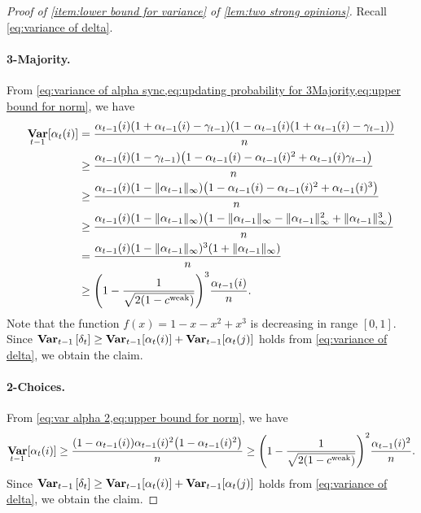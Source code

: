 \documentclass[letterpaper,11pt]{article}
\DeclarePairedDelimiter{\rbra}{\lparen}{\rparen} %
\DeclarePairedDelimiter{\sbra}{\lbrack}{\rbrack} %
\DeclareMathOperator*{\Var}{\mathbf{Var}}
\newcommand{\alphanorm}{\gamma}
\newcommand{\cweak}{c^{\mathrm{weak}}}
\newcommand{\opinion}{\mathsf{opn}}
\begin{document}
\begin{proof}[Proof of \cref{item:lower bound for variance} of \cref{lem:two strong opinions}]
    Recall \cref{eq:variance of delta}.
    \paragraph*{3-Majority.}
    From \cref{eq:variance of alpha sync,eq:updating probability for 3Majority,eq:upper bound for norm}, we have 
    \begin{align}
        \Var_{t-1}[\alpha_t(i)]
        &=\frac{\alpha_{t-1}(i)(1+\alpha_{t-1}(i)-\alphanorm_{t-1})\qty(1-\alpha_{t-1}(i)(1+\alpha_{t-1}(i)-\alphanorm_{t-1}))}{n} \nonumber\\
        &\geq \frac{\alpha_{t-1}(i)(1-\alphanorm_{t-1})\qty(1-\alpha_{t-1}(i)-\alpha_{t-1}(i)^2+\alpha_{t-1}(i)\alphanorm_{t-1})}{n} \nonumber\\
        &\geq \frac{\alpha_{t-1}(i)(1-\|\alpha_{t-1}\|_\infty)\qty(1-\alpha_{t-1}(i)-\alpha_{t-1}(i)^2+\alpha_{t-1}(i)^3)}{n} \nonumber\\
        &\geq \frac{\alpha_{t-1}(i)(1-\|\alpha_{t-1}\|_\infty)\qty(1-\|\alpha_{t-1}\|_\infty-\|\alpha_{t-1}\|_\infty^2+\|\alpha_{t-1}\|_\infty^3)}{n} \nonumber\\
        &=\frac{\alpha_{t-1}(i)(1-\|\alpha_{t-1}\|_\infty)^3(1+\|\alpha_{t-1}\|_\infty)}{n} \nonumber\\
        &\geq \qty(1-\frac{1}{\sqrt{2(1-\cweak)}})^3\frac{\alpha_{t-1}(i)}{n}. \label{eq:varalphalower}
    \end{align}
    Note that the function $f(x)=1-x-x^2+x^3$ is decreasing in range $[0,1]$.
    Since $ \Var_{t-1}\qty[\delta_t]\geq \Var_{t-1}[\alpha_t(i)]+\Var_{t-1}[\alpha_t(j)]$ holds from \cref{eq:variance of delta}, we obtain the claim.
    \paragraph*{2-Choices.}
    From \cref{eq:var alpha 2,eq:upper bound for norm}, we have
   \begin{align*}
       \Var_{t-1}[\alpha_{t}(i)]
       \geq \frac{\rbra*{1-\alpha_{t-1}(i)}\alpha_{t-1}(i)^2\rbra*{1-\alpha_{t-1}(i)^2}}{n}
       \geq \qty(1-\frac{1}{\sqrt{2(1-\cweak)}})^2\frac{\alpha_{t-1}(i)^2}{n}.
   \end{align*}
   Since $ \Var_{t-1}\qty[\delta_t]\geq \Var_{t-1}[\alpha_t(i)]+\Var_{t-1}[\alpha_t(j)]$ holds from \cref{eq:variance of delta}, we obtain the claim.
\end{proof}
\end{document}
